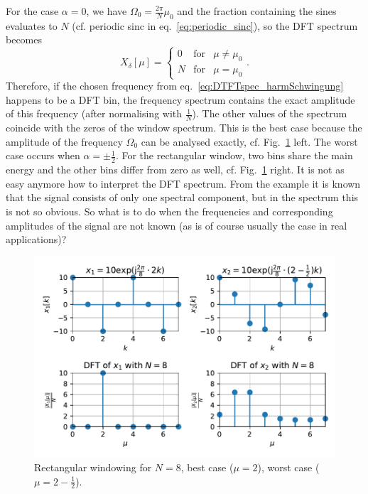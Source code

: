 \documentclass[11pt,a4paper,DIV=12]{scrartcl}
\begin{document}
%
For the case $\alpha=0$, we have $\Omega_0=\frac{2\pi}{N}\mu_0$ and the fraction
containing the sines evaluates to $N$ (cf. periodic sinc in
eq.~\eqref{eq:periodic_sinc}), so the DFT spectrum becomes
%
\begin{equation}
X_\delta[\mu]=\left\{\begin{matrix}0 & \text{for} & \mu\neq\mu_0\\N & \text{for} & \mu=\mu_0\end{matrix}\right..
\end{equation}
%
Therefore, if the chosen frequency from eq.~\eqref{eq:DTFTspec_harmSchwingung}
happens to be a DFT bin, the frequency spectrum contains the exact amplitude of
this frequency (after normalising with $\frac{1}{N}$).
%
The other values of the spectrum coincide with the zeros of the window spectrum.
%
This is the best case because the amplitude of the frequency $\Omega_0$ can be
analysed exactly, cf. Fig.~\ref{DFTbestworstcase_RectWin} left.
%
The worst case occurs when $\alpha=\pm\frac{1}{2}$.
%
For the rectangular window, two bins share the main energy and the other bins
differ from zero as well, cf. Fig.~\ref{DFTbestworstcase_RectWin} right.
%
It is not as easy anymore how to interpret the DFT spectrum.
%
From the example it is known that the signal consists of only one spectral
component, but in the spectrum this is not so obvious.
%
So what is to do when the frequencies and corresponding amplitudes of the signal
are not known (as is of course usually the case in real applications)?
%
\begin{figure}
		\centering
		\includegraphics[]{graphics/DFTbestworstcase_RectWin.pdf}
		\caption{Rectangular windowing for $N=8$,
		best case ($\mu=2$), worst case ($\mu=2-\frac{1}{2}$).}
		\label{DFTbestworstcase_RectWin}
\end{figure}
\end{document}
